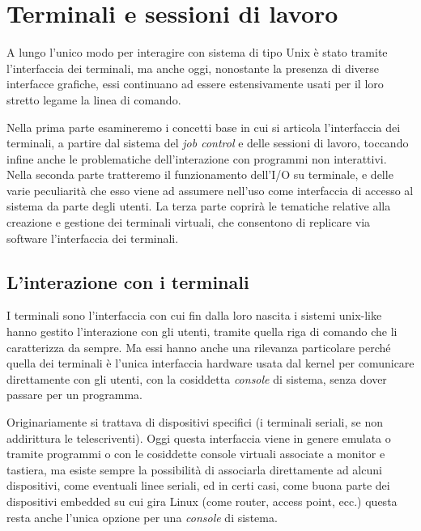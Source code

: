 
\chapter{Terminali e sessioni di lavoro}
\label{cha:session}


A lungo l'unico modo per interagire con sistema di tipo Unix è stato tramite
l'interfaccia dei terminali, ma anche oggi, nonostante la presenza di diverse
interfacce grafiche, essi continuano ad essere estensivamente usati per il
loro stretto legame la linea di comando.

Nella prima parte esamineremo i concetti base in cui si articola l'interfaccia
dei terminali, a partire dal sistema del \textit{job control} e delle sessioni
di lavoro, toccando infine anche le problematiche dell'interazione con
programmi non interattivi. Nella seconda parte tratteremo il funzionamento
dell'I/O su terminale, e delle varie peculiarità che esso viene ad assumere
nell'uso come interfaccia di accesso al sistema da parte degli utenti. La
terza parte coprirà le tematiche relative alla creazione e gestione dei
terminali virtuali, che consentono di replicare via software l'interfaccia dei
terminali.



\section{L'interazione con i terminali}
\label{sec:sess_job_control}

I terminali sono l'interfaccia con cui fin dalla loro nascita i sistemi
unix-like hanno gestito l'interazione con gli utenti, tramite quella riga di
comando che li caratterizza da sempre. Ma essi hanno anche una rilevanza
particolare perché quella dei terminali è l'unica interfaccia hardware usata
dal kernel per comunicare direttamente con gli utenti, con la cosiddetta
\textit{console} di sistema, senza dover passare per un programma.

Originariamente si trattava di dispositivi specifici (i terminali seriali, se
non addirittura le telescriventi). Oggi questa interfaccia viene in genere
emulata o tramite programmi o con le cosiddette console virtuali associate a
monitor e tastiera, ma esiste sempre la possibilità di associarla direttamente
ad alcuni dispositivi, come eventuali linee seriali, ed in certi casi, come
buona parte dei dispositivi embedded su cui gira Linux (come router, access
point, ecc.) questa resta anche l'unica opzione per una \textit{console} di
sistema.


